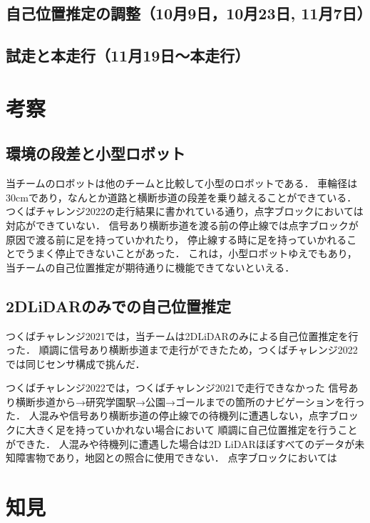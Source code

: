 \documentclass[twocolumn,9pt]{jsproceedings}
\begin{document}
\subsection{自己位置推定の調整（10月9日，10月23日, 11月7日）}


\subsection{試走と本走行（11月19日〜本走行）}


\section{考察}

\subsection{環境の段差と小型ロボット}

当チームのロボットは他のチームと比較して小型のロボットである．
車輪径は30cmであり，なんとか道路と横断歩道の段差を乗り越えることができている．
つくばチャレンジ2022の走行結果に書かれている通り，点字ブロックにおいては対応ができていない．
信号あり横断歩道を渡る前の停止線では点字ブロックが原因で渡る前に足を持っていかれたり，
停止線する時に足を持っていかれることでうまく停止できないことがあった．
これは，小型ロボットゆえでもあり，当チームの自己位置推定が期待通りに機能できてないといえる．

\subsection{2DLiDARのみでの自己位置推定}

つくばチャレンジ2021では，当チームは2DLiDARのみによる自己位置推定を行った\cite{RTshop}．
順調に信号あり横断歩道まで走行ができたため，つくばチャレンジ2022では同じセンサ構成で挑んだ．

つくばチャレンジ2022では，つくばチャレンジ2021で走行できなかった
信号あり横断歩道から→研究学園駅→公園→ゴールまでの箇所のナビゲーションを行った．
人混みや信号あり横断歩道の停止線での待機列に遭遇しない，点字ブロックに大きく足を持っていかれない場合において
順調に自己位置推定を行うことができた．
人混みや待機列に遭遇した場合は2D LiDARほぼすべてのデータが未知障害物であり，地図との照合に使用できない．
点字ブロックにおいては

\section{知見}
\end{document}
